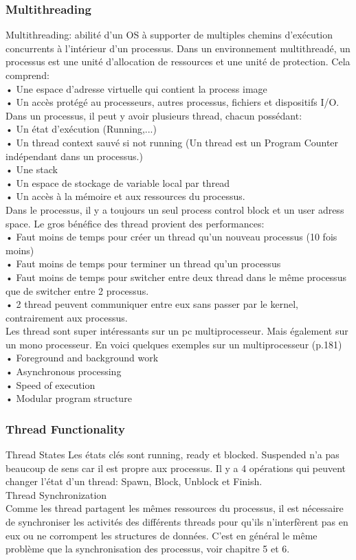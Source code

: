 \subsubsection{Multithreading}
Multithreading: abilité d’un OS à supporter de multiples chemins d’exécution concurrents à l’intérieur d’un processus. Dans un environnement multithreadé, un processus est une unité d’allocation de ressources et une unité de protection. Cela comprend:\\
• Une espace d’adresse virtuelle qui contient la process image\\
• Un accès protégé au processeurs, autres processus, fichiers et dispositifs I/O.\\
Dans un processus, il peut y avoir plusieurs thread, chacun possédant:\\
• Un état d’exécution (Running,...)\\
• Un thread context sauvé si not running (Un thread est un Program Counter\\
indépendant dans un processus.) \\
• Une stack\\
• Un espace de stockage de variable local par thread\\
• Un accès à la mémoire et aux ressources du processus.\\
Dans le processus, il y a toujours un seul process control block et un user adress space. Le gros bénéfice des thread provient des performances:\\
• Faut moins de temps pour créer un thread qu’un nouveau processus (10 fois moins)\\
• Faut moins de temps pour terminer un thread qu’un processus\\
• Faut moins de temps pour switcher entre deux thread dans le même processus que de switcher entre 2 processus.\\
• 2 thread peuvent communiquer entre eux sans passer par le kernel, contrairement aux processus.\\
Les thread sont super intéressants sur un pc multiprocesseur. Mais également sur un mono processeur. En voici quelques exemples sur un multiprocesseur (p.181)\\
• Foreground and background work \\
• Asynchronous processing\\
• Speed of execution\\
• Modular program structure\\
\subsubsection{Thread Functionality}
Thread States
Les états clés sont running, ready et blocked. Suspended n’a pas beaucoup de sens car il est propre aux processus. Il y a 4 opérations qui peuvent changer l’état d’un thread: Spawn, Block, Unblock et Finish.\\
Thread Synchronization\\
Comme les thread partagent les mêmes ressources du processus, il est nécessaire de synchroniser les activités des différents threads pour qu’ils n’interfèrent pas en eux ou ne corrompent les structures de données. C’est en général le même problème que la synchronisation des processus, voir chapitre 5 et 6.
